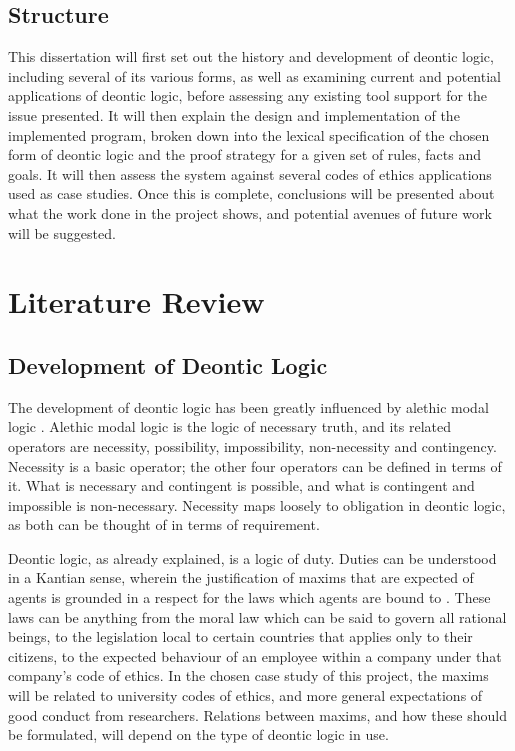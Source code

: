 \documentclass{l4proj}
\begin{document}
\section{Structure}
This dissertation will first set out the history and development of deontic logic, including several of its various forms, as well as examining current and potential applications of deontic logic, before assessing any existing tool support for the issue presented. It will then explain the design and implementation of the implemented program, broken down into the lexical specification of the chosen form of deontic logic and the proof strategy for a given set of rules, facts and goals. It will then assess the system against several codes of ethics applications used as case studies. Once this is complete, conclusions will be presented about what the work done in the project shows, and potential avenues of future work will be suggested. 

\chapter{Literature Review}

\section{Development of Deontic Logic}
The development of deontic logic has been greatly influenced by alethic modal logic \cite{sep-logic-deontic}. Alethic modal logic is the logic of necessary truth, and its related operators are necessity, possibility, impossibility, non-necessity and contingency. Necessity is a basic operator; the other four operators can be defined in terms of it. What is necessary and contingent is possible, and what is contingent and impossible is non-necessary. Necessity maps loosely to obligation in deontic logic, as both can be thought of in terms of requirement. 

Deontic logic, as already explained, is a logic of duty. Duties can be understood in a Kantian sense, wherein the justification of maxims that are expected of agents is grounded in a respect for the laws which agents are bound to \cite{sep-kant-moral}. These laws can be anything from the moral law which can be said to govern all rational beings, to the legislation local to certain countries that applies only to their citizens, to the expected behaviour of an employee within a company under that company's code of ethics. In the chosen case study of this project, the maxims will be related to university codes of ethics, and more general expectations of good conduct from researchers. Relations between maxims, and how these should be formulated, will depend on the type of deontic logic in use. 
\end{document}
